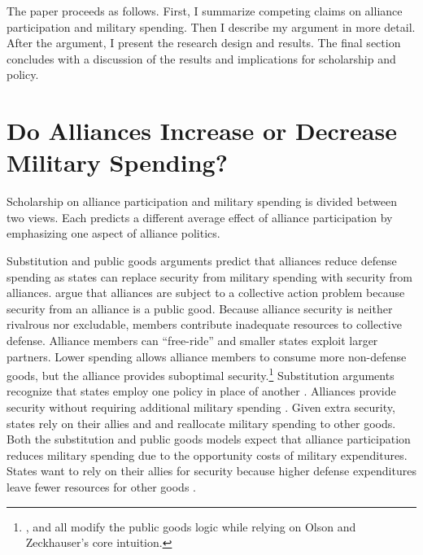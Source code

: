 \documentclass[12pt]{article}
\begin{document}
The paper proceeds as follows. 
First, I summarize competing claims on alliance participation and military spending. 
Then I describe my argument in more detail. 
After the argument, I present the research design and results. 
The final section concludes with a discussion of the results and implications for scholarship and policy.  



\section*{Do Alliances Increase or Decrease Military Spending?}


Scholarship on alliance participation and military spending is divided between two views.
Each predicts a different average effect of alliance participation by emphasizing one aspect of alliance politics.   


Substitution and public goods arguments predict that alliances reduce defense spending as states can replace security from military spending with security from alliances.
\citet{OlsonZeckhauser1966} argue that alliances are subject to a collective action problem because security from an alliance is a public good.
Because alliance security is neither rivalrous nor excludable, members contribute inadequate resources to collective defense. 
Alliance members can ``free-ride'' and smaller states exploit larger partners. 
Lower spending allows alliance members to consume more non-defense goods, but the alliance provides suboptimal security.\footnote{\citet{SandlerForbes1980}, \citet{Oneal1990} and \citet{SandlerHartley2001} all modify the public goods logic while relying on Olson and Zeckhauser's core intuition.} 
Substitution arguments recognize that states employ one policy in place of another \citep{MostStarr1989}.
Alliances provide security without requiring additional military spending \citep{Morrow1993, Conybeare1994}. 
Given extra security, states rely on their allies and and reallocate military spending to other goods. 
Both the substitution and public goods models expect that alliance participation reduces military spending due to the opportunity costs of military expenditures. 
States want to rely on their allies for security because higher defense expenditures leave fewer resources for other goods \citep{Fordham1998, Fearon2018}.
\end{document}
